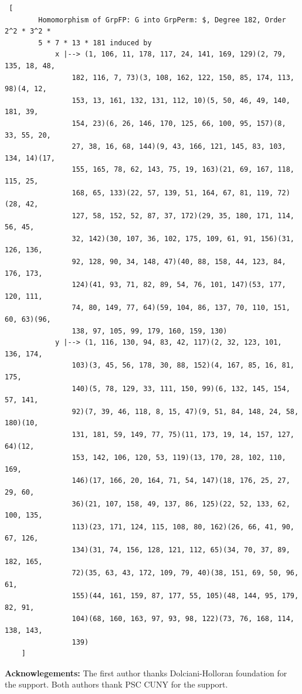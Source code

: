 \documentclass{article}
\begin{document}
\begin{verbatim}
 [
        Homomorphism of GrpFP: G into GrpPerm: $, Degree 182, Order 2^2 * 3^2 * 
        5 * 7 * 13 * 181 induced by
            x |--> (1, 106, 11, 178, 117, 24, 141, 169, 129)(2, 79, 135, 18, 48,
                182, 116, 7, 73)(3, 108, 162, 122, 150, 85, 174, 113, 98)(4, 12,
                153, 13, 161, 132, 131, 112, 10)(5, 50, 46, 49, 140, 181, 39, 
                154, 23)(6, 26, 146, 170, 125, 66, 100, 95, 157)(8, 33, 55, 20, 
                27, 38, 16, 68, 144)(9, 43, 166, 121, 145, 83, 103, 134, 14)(17,
                155, 165, 78, 62, 143, 75, 19, 163)(21, 69, 167, 118, 115, 25, 
                168, 65, 133)(22, 57, 139, 51, 164, 67, 81, 119, 72)(28, 42, 
                127, 58, 152, 52, 87, 37, 172)(29, 35, 180, 171, 114, 56, 45, 
                32, 142)(30, 107, 36, 102, 175, 109, 61, 91, 156)(31, 126, 136, 
                92, 128, 90, 34, 148, 47)(40, 88, 158, 44, 123, 84, 176, 173, 
                124)(41, 93, 71, 82, 89, 54, 76, 101, 147)(53, 177, 120, 111, 
                74, 80, 149, 77, 64)(59, 104, 86, 137, 70, 110, 151, 60, 63)(96,
                138, 97, 105, 99, 179, 160, 159, 130)
            y |--> (1, 116, 130, 94, 83, 42, 117)(2, 32, 123, 101, 136, 174, 
                103)(3, 45, 56, 178, 30, 88, 152)(4, 167, 85, 16, 81, 175, 
                140)(5, 78, 129, 33, 111, 150, 99)(6, 132, 145, 154, 57, 141, 
                92)(7, 39, 46, 118, 8, 15, 47)(9, 51, 84, 148, 24, 58, 180)(10, 
                131, 181, 59, 149, 77, 75)(11, 173, 19, 14, 157, 127, 64)(12, 
                153, 142, 106, 120, 53, 119)(13, 170, 28, 102, 110, 169, 
                146)(17, 166, 20, 164, 71, 54, 147)(18, 176, 25, 27, 29, 60, 
                36)(21, 107, 158, 49, 137, 86, 125)(22, 52, 133, 62, 100, 135, 
                113)(23, 171, 124, 115, 108, 80, 162)(26, 66, 41, 90, 67, 126, 
                134)(31, 74, 156, 128, 121, 112, 65)(34, 70, 37, 89, 182, 165, 
                72)(35, 63, 43, 172, 109, 79, 40)(38, 151, 69, 50, 96, 61, 
                155)(44, 161, 159, 87, 177, 55, 105)(48, 144, 95, 179, 82, 91, 
                104)(68, 160, 163, 97, 93, 98, 122)(73, 76, 168, 114, 138, 143, 
                139)
    ]

\end{verbatim}
{\bf Acknowlegements:} The first author thanks Dolciani-Holloran foundation for the support. Both authors thank PSC CUNY for the support.
\end{document}
